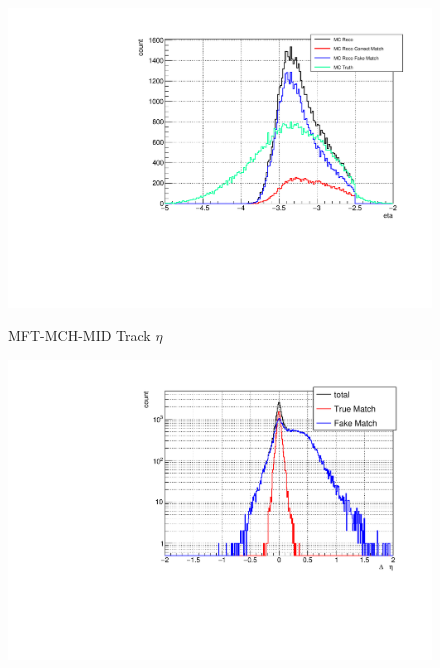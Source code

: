                \begin{figure}[htbp]
                    \centering
                    \begin{minipage}{0.45\textwidth} %
                        \centering
                        \includegraphics[width=\textwidth]{fig/3_3_matching_eta_comp.pdf} %
                        \caption{MFT-MCH-MID Track $\eta$}
                        \label{Analysis:Matching:eta}
                    \end{minipage}
                    \hfill
                    \begin{minipage}{0.45\textwidth}
                        \centering
                        \includegraphics[width=\textwidth]{fig/3_3_DeltaEta_pt_0to30.pdf} %
                        \caption{}
                        \label{Analysis:Matching:DeltaEta}
                    \end{minipage}
                \end{figure}
